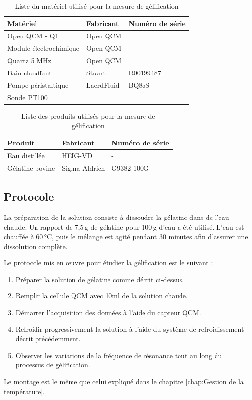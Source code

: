 \begin{table}[H]
    \centering
    \begin{tabular}{|l|l|l|}
        \hline
        \textbf{Matériel}         & \textbf{Fabricant}   & \textbf{Numéro de série} \\
        \hline
        Open QCM - Q1             & Open QCM              &   \\
        Module électrochimique    & Open QCM              &   \\
        Quartz 5 MHz             & Open QCM              &   \\
        Bain chauffant            & Stuart                &  R00199487 \\
        Pompe péristaltique       & LaerdFluid            &  BQ8oS \\
        Sonde PT100               &                       &   \\
        \hline
    \end{tabular}
    \caption{Liste du matériel utilisé pour la mesure de gélification}
\end{table}

\begin{table}[H]
    \centering
    \begin{tabular}{|l|l|l|}
        \hline
        \textbf{Produit} & \textbf{Fabricant}   & \textbf{Numéro de série} \\
        \hline
        Eau distillée    & HEIG-VD              &   -           \\
        Gélatine bovine  & Sigma-Aldrich        &   G9382-100G  \\
        \hline
    \end{tabular}
    \caption{Liste des produits utilisés pour la mesure de gélification}
\end{table}

\subsection{Protocole}


La préparation de la solution consiste à dissoudre la gélatine dans de l’eau chaude. Un rapport de 7,5 g de gélatine pour 100 g d’eau a été utilisé. L’eau est chauffée à 60 °C, puis le mélange est agité pendant 30 minutes afin d’assurer une dissolution complète.

Le protocole mis en œuvre pour étudier la gélification est le suivant :
\begin{enumerate}
    \item Préparer la solution de gélatine comme décrit ci-dessus.
    \item Remplir la cellule QCM avec 10ml de la solution chaude.
    \item Démarrer l’acquisition des données à l’aide du capteur QCM.
    \item Refroidir progressivement la solution à l’aide du système de refroidissement décrit précédemment.
    \item Observer les variations de la fréquence de résonance tout au long du processus de gélification.
\end{enumerate}
Le montage est le même que celui expliqué dans le chapitre \ref{chap:Gestion de la température}.

